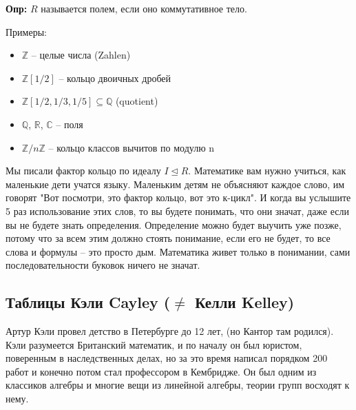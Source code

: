 \textbf{Опр:} $R$ называется полем, если оно коммутативное тело.

Примеры:
\begin{itemize}
    \item $\mathbb{Z}$ – целые числа (Zahlen)
    \item $\mathbb{Z}[1/2]$ – кольцо двоичных дробей
    \item $\mathbb{Z}[1/2, 1/3, 1/5]\subseteq\mathbb{Q}$ (quotient)
    \item $\mathbb{Q}$, $\mathbb{R}$, $\mathbb{C}$ – поля
    \item $\mathbb{Z}/n\mathbb{Z}$ – кольцо классов вычитов по модулю n
\end{itemize}

Мы писали фактор кольцо по идеалу $I\unlhd R$. Математике вам нужно учиться,
как маленькие дети учатся языку. Маленьким детям не объясняют каждое слово, им
говорят "Вот посмотри, это фактор кольцо, вот это к-цикл". И когда вы услышите
5 раз использование этих слов, то вы будете понимать, что они значат, даже если
вы не будете знать определения. Определение можно будет выучить уже позже,
потому что за всем этим должно стоять понимание, если его не будет, то все
слова и формулы – это просто дым. Математика живет только в понимании, сами
последовательности буковок ничего не значат.

\subsection{Таблицы Кэли Cayley ($\neq$ Келли Kelley)}
Артур Кэли провел детство в Петербурге до 12 лет, (но Кантор там родился). Кэли
разумеется Британский математик, и по началу он был юристом, поверенным в
наследственных делах, но за это время написал порядком 200 работ и конечно
потом стал профессором в Кембридже. Он был одним из классиков алгебры и многие
вещи из линейной алгебры, теории групп восходят к нему.

